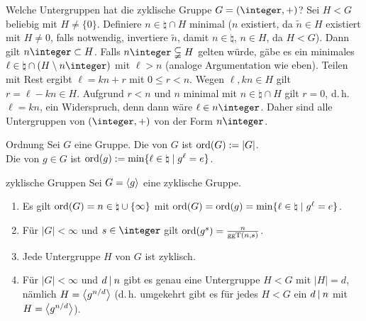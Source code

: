 \begin{Bem}
    Welche Untergruppen hat die zyklische Gruppe $G = (\integer, +)$?
    Sei $H < G$ beliebig mit $H \not= \{0\}$.
    Definiere $n \in \natural \cap H$ minimal
    ($n$ existiert, da $\widetilde{n} \in H$ existiert mit $H \not= 0$,
    falls notwendig, invertiere $\widetilde{n}$, damit $n \in \natural$,
    $n \in H$, da $H < G$).
    Dann gilt $n\integer \subset H$.
    Falls $n\integer \subsetneqq H$ gelten würde, gäbe es ein minimales
    $\ell \in \natural \cap (H \setminus n\integer)$ mit $\ell > n$
    (analoge Argumentation wie eben).
    Teilen mit Rest ergibt $\ell = kn + r$ mit $0 \le r < n$.
    Wegen $\ell, kn \in H$ gilt $r = \ell - kn \in H$.
    Aufgrund $r < n$ und $n$ minimal mit $n \in \natural \cap H$ gilt
    $r = 0$, d.\,h. $\ell = kn$, ein Widerspruch,
    denn dann wäre $\ell \in n\integer$.
    Daher sind alle Untergruppen von $(\integer, +)$ von der Form $n\integer$.
\end{Bem}

\linie

\begin{Def}{Ordnung}
    Sei $G$ eine Gruppe.
    Die  von $G$ ist $\operatorname{ord}(G) := |G|$.\\
    Die  von $g \in G$ ist
    $\operatorname{ord}(g) := \min\{\ell \in \natural \;|\; g^\ell = e\}$.
\end{Def}

\begin{Prop}{zyklische Gruppen}
    Sei $G = \left\langle g\right\rangle$ eine zyklische Gruppe.
    \begin{enumerate}[label=(\alph*)]
        \item
        Es gilt $\operatorname{ord}(G) = n \in \natural \cup \{\infty\}$ mit
        $\operatorname{ord}(G) = \operatorname{ord}(g) = \min\{\ell \in \natural \;|\; g^\ell = e\}$.
        
        \item
        Für $|G| < \infty$ und $s \in \integer$
        gilt $\operatorname{ord}(g^s) = \frac{n}{\operatorname{ggT}(n, s)}$.
        
        \item
        Jede Untergruppe $H$ von $G$ ist zyklisch.
        
        \item
        Für $|G| < \infty$ und $d \mathbin{|} n$ gibt es genau eine Untergruppe
        $H < G$ mit $|H| = d$, nämlich $H = \left\langle g^{n/d}\right\rangle$
        (d.\,h. umgekehrt gibt es für jedes $H < G$ ein $d \mathbin{|} n$ mit
        $H = \left\langle g^{n/d}\right\rangle$).
    \end{enumerate}
\end{Prop}

